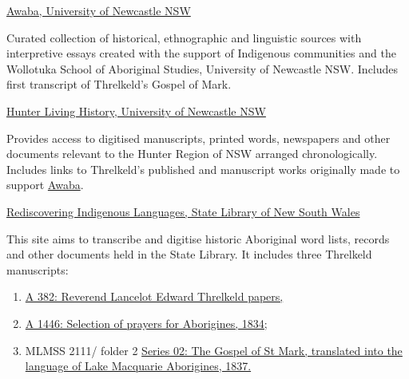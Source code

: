 \noindent \href{https://downloads.newcastle.edu.au/library/cultural%20collections/awaba/index.html}{Awaba, University of Newcastle NSW}

\smallskip

\noindent Curated collection of historical, ethnographic and linguistic sources with interpretive essays created with the support of Indigenous communities and the Wollotuka School of Aboriginal Studies, University of Newcastle NSW. Includes first transcript of Threlkeld’s Gospel of Mark.

\bigskip \bigskip

\noindent \href{https://hunterlivinghistories.com/dreaming/}{Hunter Living History, University of Newcastle NSW}

\smallskip

\noindent Provides access to digitised manuscripts, printed words, newspapers and other documents relevant to the Hunter Region of NSW arranged chronologically. Includes links to Threlkeld’s published and manuscript works originally made to support \href{https://downloads.newcastle.edu.au/library/cultural%20collections/awaba/index.html}{Awaba}.

\bigskip

\noindent \href{https://transcripts.sl.nsw.gov.au/section/rediscovering-indigenous-languages}{Rediscovering Indigenous Languages, State Library of New South Wales}

\smallskip

\noindent This site aims to transcribe and digitise historic Aboriginal word lists, records and other documents held in the State Library. It includes three Threlkeld manu\-scripts:

\begin{enumerate}
    \item \href{https://transcripts.sl.nsw.gov.au/document/382-reverend-lancelot-edward-threlkeld-papers-1822-1862}{A 382: Reverend Lancelot Edward Threlkeld papers,}
    \item \href{https://transcripts.sl.nsw.gov.au/document/1446-selection-prayers-aborigines-1834-translated-northumberland-dialect-l-e-threlkeld}{A 1446: Selection of prayers for Aborigines, 1834;}
    \item MLMSS 2111/ folder 2 \href{https://transcripts.sl.nsw.gov.au/document/series-02-gospel-st-mark-translated-language-lake-macquarie-aborigines-1837}{Series 02: The Gospel of St Mark, translated into the language of Lake Macquarie Aborigines, 1837.}
\end{enumerate}
